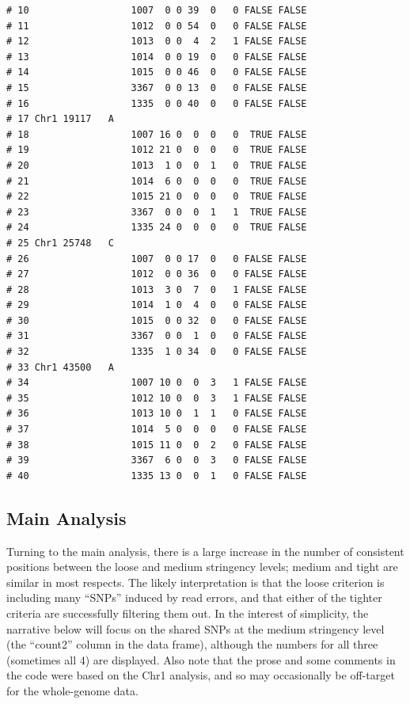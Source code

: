 \documentclass{article}\usepackage[]{graphicx}\usepackage[]{color}
\makeatletter
\newenvironment{kframe}{%
 \def\at@end@of@kframe{}%
 \ifinner\ifhmode%
  \def\at@end@of@kframe{\end{minipage}}%
  \begin{minipage}{\columnwidth}%
 \fi\fi%
 \def\FrameCommand##1{\hskip\@totalleftmargin \hskip-\fboxsep
 \colorbox{shadecolor}{##1}\hskip-\fboxsep
     \hskip-\linewidth \hskip-\@totalleftmargin \hskip\columnwidth}%
 \MakeFramed {\advance\hsize-\width
   \@totalleftmargin\z@ \linewidth\hsize
   \@setminipage}}%
 {\par\unskip\endMakeFramed%
 \at@end@of@kframe}
\newenvironment{knitrout}{}{} %
\makeatother
\begin{document}
\begin{knitrout}
\begin{kframe}
\begin{verbatim}
# 10                  1007  0 0 39  0   0 FALSE FALSE        
# 11                  1012  0 0 54  0   0 FALSE FALSE        
# 12                  1013  0 0  4  2   1 FALSE FALSE        
# 13                  1014  0 0 19  0   0 FALSE FALSE        
# 14                  1015  0 0 46  0   0 FALSE FALSE        
# 15                  3367  0 0 13  0   0 FALSE FALSE        
# 16                  1335  0 0 40  0   0 FALSE FALSE        
# 17 Chr1 19117   A                                          
# 18                  1007 16 0  0  0   0  TRUE FALSE        
# 19                  1012 21 0  0  0   0  TRUE FALSE        
# 20                  1013  1 0  0  1   0  TRUE FALSE        
# 21                  1014  6 0  0  0   0  TRUE FALSE        
# 22                  1015 21 0  0  0   0  TRUE FALSE        
# 23                  3367  0 0  0  1   1  TRUE FALSE        
# 24                  1335 24 0  0  0   0  TRUE FALSE        
# 25 Chr1 25748   C                                          
# 26                  1007  0 0 17  0   0 FALSE FALSE        
# 27                  1012  0 0 36  0   0 FALSE FALSE        
# 28                  1013  3 0  7  0   1 FALSE FALSE        
# 29                  1014  1 0  4  0   0 FALSE FALSE        
# 30                  1015  0 0 32  0   0 FALSE FALSE        
# 31                  3367  0 0  1  0   0 FALSE FALSE        
# 32                  1335  1 0 34  0   0 FALSE FALSE        
# 33 Chr1 43500   A                                          
# 34                  1007 10 0  0  3   1 FALSE FALSE        
# 35                  1012 10 0  0  3   1 FALSE FALSE        
# 36                  1013 10 0  1  1   0 FALSE FALSE        
# 37                  1014  5 0  0  0   0 FALSE FALSE        
# 38                  1015 11 0  0  2   0 FALSE FALSE        
# 39                  3367  6 0  0  3   0 FALSE FALSE        
# 40                  1335 13 0  0  1   0 FALSE FALSE
\end{verbatim}
\end{kframe}
\end{knitrout}


\subsection{Main Analysis}
Turning to the main analysis, there is a large increase in the number of consistent positions between the loose and
medium stringency levels; medium and tight are similar in most respects.  The likely interpretation is that the loose
criterion is including many ``SNPs'' induced by read errors, and that either of the tighter criteria are successfully
filtering them out.  In the interest of simplicity, the narrative below will focus on the shared SNPs at the medium
stringency level (the ``count2'' column in the data frame), although the numbers for all three (sometimes all 4) are
displayed.  Also note that the prose and some comments in the code were based on the Chr1 analysis, and so may
occasionally be off-target for the whole-genome data.
\end{document}
